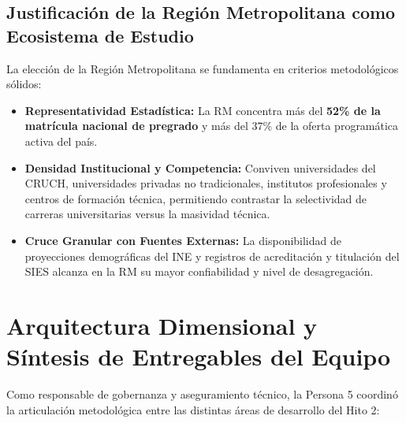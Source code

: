 \documentclass[11pt,a4paper]{article}
\begin{document}
\subsection{Justificación de la Región Metropolitana como Ecosistema de Estudio}
La elección de la Región Metropolitana se fundamenta en criterios metodológicos sólidos:
\begin{itemize}[leftmargin=*]
    \item \textbf{Representatividad Estadística:} La RM concentra más del \textbf{52\% de la matrícula nacional de pregrado} y más del 37\% de la oferta programática activa del país.
    \item \textbf{Densidad Institucional y Competencia:} Conviven universidades del CRUCH, universidades privadas no tradicionales, institutos profesionales y centros de formación técnica, permitiendo contrastar la selectividad de carreras universitarias versus la masividad técnica.
    \item \textbf{Cruce Granular con Fuentes Externas:} La disponibilidad de proyecciones demográficas del INE y registros de acreditación y titulación del SIES alcanza en la RM su mayor confiabilidad y nivel de desagregación.
\end{itemize}

\section{Arquitectura Dimensional y Síntesis de Entregables del Equipo}
\label{sec:arquitectura}

Como responsable de gobernanza y aseguramiento técnico, la Persona 5 coordinó la articulación metodológica entre las distintas áreas de desarrollo del Hito 2:
\end{document}
